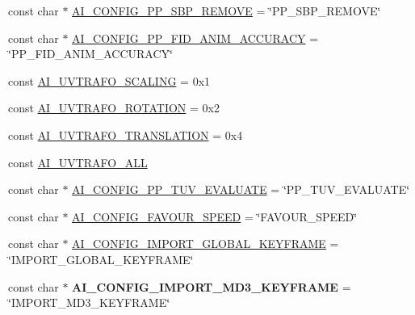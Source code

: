 \begin{DoxyCompactItemize}
\item 
const char $\ast$ \hyperlink{namespaceassimp_1_1config_ace7be736580879656e93bc3cc3f7ff46}{A\+I\+\_\+\+C\+O\+N\+F\+I\+G\+\_\+\+P\+P\+\_\+\+S\+B\+P\+\_\+\+R\+E\+M\+O\+V\+E} = \char`\"{}P\+P\+\_\+\+S\+B\+P\+\_\+\+R\+E\+M\+O\+V\+E\char`\"{}
\item 
const char $\ast$ \hyperlink{namespaceassimp_1_1config_ade29ae2f53bb0a9bab7464afe44632ff}{A\+I\+\_\+\+C\+O\+N\+F\+I\+G\+\_\+\+P\+P\+\_\+\+F\+I\+D\+\_\+\+A\+N\+I\+M\+\_\+\+A\+C\+C\+U\+R\+A\+C\+Y} = \char`\"{}P\+P\+\_\+\+F\+I\+D\+\_\+\+A\+N\+I\+M\+\_\+\+A\+C\+C\+U\+R\+A\+C\+Y\char`\"{}
\item 
const \hyperlink{namespaceassimp_1_1config_a41b94fcbeccbf120bfdf0d1d0259b923}{A\+I\+\_\+\+U\+V\+T\+R\+A\+F\+O\+\_\+\+S\+C\+A\+L\+I\+N\+G} = 0x1
\item 
const \hyperlink{namespaceassimp_1_1config_ae93d5d4ab5e6ee436d8e3f4bb9f88e99}{A\+I\+\_\+\+U\+V\+T\+R\+A\+F\+O\+\_\+\+R\+O\+T\+A\+T\+I\+O\+N} = 0x2
\item 
const \hyperlink{namespaceassimp_1_1config_a2d63f4a0199bb79cd96368310f4a68e8}{A\+I\+\_\+\+U\+V\+T\+R\+A\+F\+O\+\_\+\+T\+R\+A\+N\+S\+L\+A\+T\+I\+O\+N} = 0x4
\item 
const \hyperlink{namespaceassimp_1_1config_a16cb07d1ce8bf8dc726c1d6150eb8dc0}{A\+I\+\_\+\+U\+V\+T\+R\+A\+F\+O\+\_\+\+A\+L\+L}
\item 
const char $\ast$ \hyperlink{namespaceassimp_1_1config_a7caca533ad5275383a170f49b9498def}{A\+I\+\_\+\+C\+O\+N\+F\+I\+G\+\_\+\+P\+P\+\_\+\+T\+U\+V\+\_\+\+E\+V\+A\+L\+U\+A\+T\+E} = \char`\"{}P\+P\+\_\+\+T\+U\+V\+\_\+\+E\+V\+A\+L\+U\+A\+T\+E\char`\"{}
\item 
const char $\ast$ \hyperlink{namespaceassimp_1_1config_a8dd03b04b28e2f4d049e1a0cacc5dd30}{A\+I\+\_\+\+C\+O\+N\+F\+I\+G\+\_\+\+F\+A\+V\+O\+U\+R\+\_\+\+S\+P\+E\+E\+D} = \char`\"{}F\+A\+V\+O\+U\+R\+\_\+\+S\+P\+E\+E\+D\char`\"{}
\item 
const char $\ast$ \hyperlink{namespaceassimp_1_1config_afea36345c8216f47ec1dad277672706d}{A\+I\+\_\+\+C\+O\+N\+F\+I\+G\+\_\+\+I\+M\+P\+O\+R\+T\+\_\+\+G\+L\+O\+B\+A\+L\+\_\+\+K\+E\+Y\+F\+R\+A\+M\+E} = \char`\"{}I\+M\+P\+O\+R\+T\+\_\+\+G\+L\+O\+B\+A\+L\+\_\+\+K\+E\+Y\+F\+R\+A\+M\+E\char`\"{}
\item 
\hypertarget{namespaceassimp_1_1config_a39ac019e0c733bfd1ad2c9bd531161b8}{const char $\ast$ {\bfseries A\+I\+\_\+\+C\+O\+N\+F\+I\+G\+\_\+\+I\+M\+P\+O\+R\+T\+\_\+\+M\+D3\+\_\+\+K\+E\+Y\+F\+R\+A\+M\+E} = \char`\"{}I\+M\+P\+O\+R\+T\+\_\+\+M\+D3\+\_\+\+K\+E\+Y\+F\+R\+A\+M\+E\char`\"{}}\label{namespaceassimp_1_1config_a39ac019e0c733bfd1ad2c9bd531161b8}


\end{DoxyCompactItemize}
